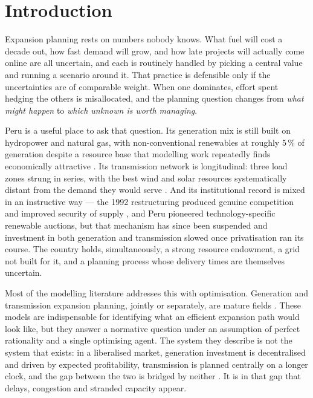 \section{Introduction}
\label{sec:introduction}

Expansion planning rests on numbers nobody knows. What fuel will cost a decade out,
how fast demand will grow, and how late projects will actually come online are all
uncertain, and each is routinely handled by picking a central value and running a
scenario around it. That practice is defensible only if the uncertainties are of
comparable weight. When one dominates, effort spent hedging the others is
misallocated, and the planning question changes from \emph{what might happen} to
\emph{which unknown is worth managing}.

Peru is a useful place to ask that question. Its generation mix is still built on
hydropower and natural gas, with non-conventional renewables at roughly 5\,\% of
generation despite a resource base that modelling work repeatedly finds economically
attractive \citep{fiestas2024,delacruz2024}. Its transmission network is
longitudinal: three load zones strung in series, with the best wind and solar
resources systematically distant from the demand they would serve
\citep{valdivia2024}. And its institutional record is mixed in an instructive way ---
the 1992 restructuring produced genuine competition and improved security of supply
\citep{rudnick2019,perezreyes2009}, and Peru pioneered technology-specific renewable
auctions, but that mechanism has since been suspended and investment in both
generation and transmission slowed once privatisation ran its course. The country
holds, simultaneously, a strong resource endowment, a grid not built for it, and a
planning process whose delivery times are themselves uncertain.

Most of the modelling literature addresses this with optimisation. Generation and
transmission expansion planning, jointly or separately, are mature fields
\citep{gacitua2018,babatunde2020,herding2024,tao2025,valipour2026}. These models are
indispensable for identifying what an efficient expansion path would look like, but
they answer a normative question under an assumption of perfect rationality and a
single optimising agent. The system they describe is not the system that exists: in a
liberalised market, generation investment is decentralised and driven by expected
profitability, transmission is planned centrally on a longer clock, and the gap
between the two is bridged by neither \citep{dyner2001,herrera2019}. It is in that
gap that delays, congestion and stranded capacity appear.

